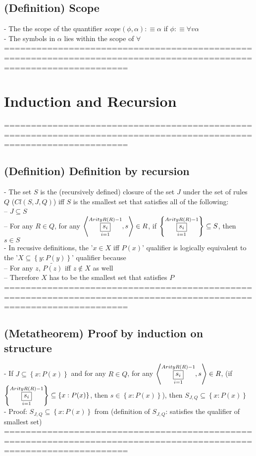 \documentclass{book}
\newcommand{\is}{:\equiv}
\newcommand{\pnot}[1]{\widetilde{#1}}
\newcommand{\inot}{\not}
\newcommand{\set}[1]{\left\{ #1 \right\}}
\newcommand{\seq}[1]{\left\langle #1 \right\rangle}
\newcommand{\vdc}[3]{\underset{#2}{\overset{#3}{\fbox{$#1$}}}}
\begin{document}
\subsection{(Definition) Scope} %
	- The the scope of the quantifier $scope(\phi, \alpha) \is \alpha$ if $\phi \is \forall v \alpha$ \\
	- The symbols in $\alpha$ lies within the scope of $\forall$ \\
	===================================================================================================================

\section{Induction and Recursion}
	===================================================================================================================
\subsection{(Definition) Definition by recursion} %
	- The set $S$ is the (recursively defined) closure of the set $J$ under the set of rules $Q$ ($Cl(S, J, Q)$) iff $S$ is the smallest set that satisfies all of the following: \\
		-- $J \subseteq S$ \\
		-- For any $R \in Q$, for any $\seq{\vdc{s_i}{i=1}{ArityR(R)-1}, s} \in R$, if $\set{\vdc{s_i}{i=1}{ArityR(R)-1}} \subseteq S$, then $s \in S$ \\
	- In recusive definitions, the '$x \in X$ iff $P(x)$' qualifier is logically equivalent to the '$X \subseteq \set{y: P(y)}$' qualifier because \\
		-- For any $z$, $\pnot{P(z)}$ iff $z \inot \in X$ as well \\
		-- Therefore $X$ has to be the smallest set that satisfies $P$ \\
	===================================================================================================================
\subsection{(Metatheorem) Proof by induction on structure} %
	- If $J \subseteq \set{x: P(x)}$ and for any $R \in Q$, for any $\seq{\vdc{s_i}{i=1}{ArityR(R)-1}, s} \in R$, (if $\set{\vdc{s_i}{i=1}{ArityR(R)-1}} \subseteq \set{x: P(x)}$, then $s \in \set{x: P(x)}$), then $S_{J, Q} \subseteq \set{x: P(x)}$ \\
	- Proof: $S_{J, Q} \subseteq \set{x: P(x)}$ from (definition of $S_{J, Q}$: satisfies the qualifier of smallest set) \\
	===================================================================================================================
\end{document}
